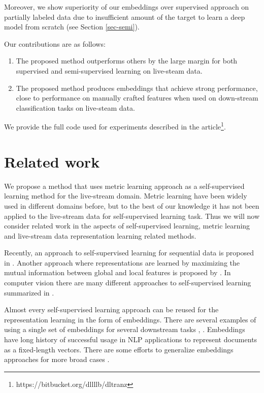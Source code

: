 \documentclass[sigconf]{acmart}
\begin{document}
Moreover, we show superiority of our embeddings over supervised approach on partially labeled data due to insufficient amount of the target to learn a deep model from scratch (see Section \ref{sec-semi}).

Our contributions are as follows:
\begin{enumerate}
    \item The proposed method outperforms others by the large margin for both supervised and semi-supervised learning on live-steam data.
    \item The proposed method produces embeddings that achieve strong performance, close to performance on manually crafted features when used on down-stream classification tasks on live-steam data.
\end{enumerate}

We provide the full code used for experiments described in the article\footnote{https://bitbucket.org/dllllb/dltranz}.

\section{Related work}  \label{sec-rel-work}

We propose a method that uses metric learning approach as a self-supervised learning method for the live-stream domain. Metric learning have been widely used in different domains before, but to the best of our knowledge it has not been applied to the live-stream data for self-supervised learning task. Thus we will now consider related work in the aspects of self-supervised learning, metric learning and live-stream data representation learning related methods.

Recently, an approach to self-supervised learning for sequential data is proposed in \cite{DBLP:journals/corr/abs-1807-03748}. Another approach where representations are learned by maximizing the mutual information between global and local features is proposed by \cite{hjelm2018learning}. In computer vision there are many different approaches to self-supervised learning summarized in \cite{jing2019selfsupervised}.

Almost every self-supervised learning approach can be reused for the representation learning in the form of embeddings. There are several examples of using a single set of embeddings for several downstream tasks \cite{Song2017LearningUE}, \cite{Zhai:2019:LUE:3292500.3330739}.
Embeddings have long history of successful usage in NLP applications to represent documents as a fixed-length vectors. There are some efforts to generalize embeddings approaches for more broad cases \cite{Wu2017StarSpaceEA}.
\end{document}
